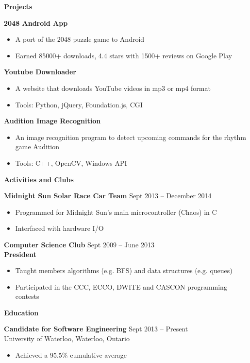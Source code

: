 \documentclass{letter}
\begin{document}
{\bfseries \Large Projects}

\vspace{-1.5mm}
{\bfseries 2048 Android App}
\vspace{-3mm}
\begin{itemize}
    \item A port of the 2048 puzzle game to Android
    \item Earned 85000+ downloads, 4.4 stars with 1500+ reviews on Google Play
\end{itemize}
\vspace{-3mm}
{\bfseries Youtube Downloader}
\vspace{-3mm}
\begin{itemize}
    \item A website that downloads YouTube videos in mp3 or mp4 format
    \item Tools: Python, jQuery, Foundation.js, CGI
\end{itemize}
\vspace{-3mm}
{\bfseries Audition Image Recognition}
\vspace{-3mm}
\begin{itemize}
    \item An image recognition program to detect upcoming commands for the rhythm game Audition
    \item Tools: C++, OpenCV, Windows API
\end{itemize}

{\bfseries \Large Activities and Clubs}

\vspace{-1.5mm}
{\bfseries Midnight Sun Solar Race Car Team} \hfill Sept 2013 -- December 2014
\vspace{-3mm}
\begin{itemize}
    \item Programmed for Midnight Sun's main microcontroller (Chaos) in C
    \item Interfaced with hardware I/O
\end{itemize}
\vspace{-3mm}
{\bfseries Computer Science Club} \hfill Sept 2009 -- June 2013 \\
{\bfseries President}
\vspace{-3mm}
\begin{itemize}
  \item Taught members algorithms (e.g. BFS) and data structures (e.g. queues)
  \item Participated in the CCC, ECCO, DWITE and CASCON programming contests
\end{itemize}

{\bfseries \Large Education}

\vspace{-1.5mm}
{\bfseries Candidate for Software Engineering} \hfill Sept 2013 -- Present \\
University of Waterloo, Waterloo, Ontario
\vspace{-3mm}
\begin{itemize}
    \item Achieved a 95.5\% cumulative average
\end{itemize}
\end{document}
